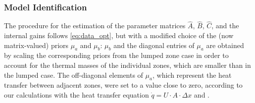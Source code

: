 \subsubsection{Model Identification}
The procedure for the estimation of the parameter matrices $\hat{A}$, $\hat{B}$, $\hat{C}$, and the internal gains follows \eqref{eq:data_opt}, but with a modified choice of the (now matrix-valued) priors $\mu_a$ and $\mu_b$: $\mu_b$ and the diagonal entries of $\mu_a$ are obtained by scaling the corresponding priors from the lumped zone case in order to account for the thermal masses of the individual zones, which are smaller than in the lumped case. The off-diagonal elements of $\mu_a$, which represent the heat transfer between adjacent zones, were set to a value close to zero, according to our calculations with the heat transfer equation $\dot{q} = U\cdot A \cdot \Delta x$ and \cite{Koehler:2013aa}.
